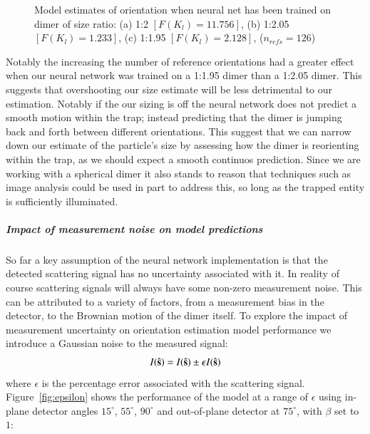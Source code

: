 \documentclass[final,  3p]{elsarticle}
\begin{document}
\begin{figure}[h]
\begin{subfigure}{0.31\textwidth}
	\end{subfigure}
	\caption{Model estimates of orientation when neural net has been trained on dimer of size ratio: (a) 1:2 $[F(K_l)=11.756]$, (b) 1:2.05 $[F(K_l)=1.233]$, (c) 1:1.95 $[F(K_l)=2.128]$, ($n_{refs} = 126$)}
	\label{fig:refs}
\end{figure}

Notably the increasing the number of reference orientations had a greater effect when our neural network was trained on a 1:1.95 dimer than a 1:2.05 dimer. This suggests that overshooting our size estimate will be less detrimental to our estimation. Notably if the our sizing is off the neural network does not predict a smooth motion within the trap; instead predicting that the dimer is jumping back and forth between different orientations. This suggest that we can narrow down our estimate of the particle's size by assessing how the dimer is reorienting within the trap, as we should expect a smooth continuos prediction. Since we are working with a spherical dimer it also stands to reason that techniques such as image analysis could be used in part to address this, so long as the trapped entity is sufficiently illuminated. 
\subparagraph{Impact of measurement noise on model predictions}
\label{sec:epsilon}

So far a key assumption of the neural network implementation is that the detected scattering signal has no uncertainty associated with it. In reality of course scattering signals will always have some non-zero measurement noise. This can be attributed to a variety of factors, from a measurement bias in the detector, to the Brownian motion of the dimer itself. To explore the impact of measurement uncertainty on orientation estimation model performance we introduce a Gaussian noise to the measured signal:
\begin{align}
	I(\hat{\bf s}) = I(\hat{\bf s}) \pm \epsilon I(\hat{\bf s})
\end{align}
where $\epsilon$ is the percentage error associated with the scattering signal. Figure~\ref{fig:epsilon} shows the performance of the model at a range of $\epsilon$ using in-plane detector angles $15^{\circ}$, $55^{\circ}$, $90^{\circ}$ and out-of-plane detector at $75^{\circ}$, with $\beta$ set to $1$:
\end{document}
